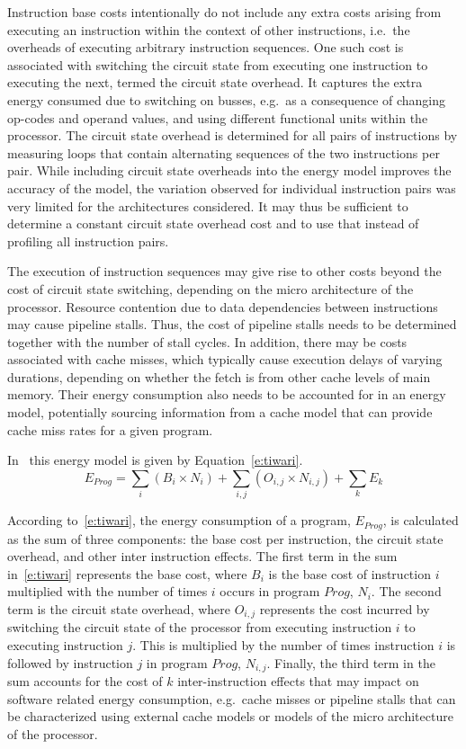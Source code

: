 Instruction base costs intentionally do not include any extra costs arising
from executing an instruction within the context of other instructions, i.e.\
the overheads of executing arbitrary instruction sequences.
%
One such cost is associated with switching the circuit state from executing one
instruction to executing the next, termed the circuit state overhead. It
captures the extra energy consumed due to switching on busses, e.g.\ as a
consequence of changing op-codes and operand values, and using different
functional units within the processor. The circuit state overhead is determined
for all pairs of instructions \todo{or pairs of types of instructions} by
measuring loops that contain alternating sequences of the two instructions per
pair.
%
While including circuit state overheads into the energy model improves the
accuracy of the model, the variation observed for individual instruction pairs
was very limited for the architectures considered. It may thus be sufficient to
determine a constant circuit state overhead cost and to use that instead of
profiling all instruction pairs.

The execution of instruction sequences may give rise to other costs beyond the
cost of circuit state switching, depending on the micro architecture of the
processor. Resource contention due to data dependencies between instructions
may cause pipeline stalls. Thus, the cost of pipeline stalls needs to be
determined together with the number of stall cycles.
%
In addition, there may be costs associated with cache misses, which typically
cause execution delays of varying durations, depending on whether the fetch is
from other cache levels of main memory. Their energy consumption also needs to
be accounted for in an energy model, potentially sourcing information from a
cache model that can provide cache miss rates for a given program.

In~\cite{TiwariWolfeInstructionLevelPowerAnalysi:1996} this energy model is
given by Equation~\ref{e:tiwari}.
%
\begin{equation}\label{e:tiwari}
E_{Prog} = \sum_i (B_i \times N_i) + \sum_{i,j} (O_{i,j} \times N_{i,j}) + \sum_k E_k
\end{equation}

According to~\ref{e:tiwari}, the energy consumption of a program, $E_{Prog}$, is
calculated as the sum of three components: the base cost per instruction, the
circuit state overhead, and other inter instruction effects.
%
The first term in the sum in~\ref{e:tiwari} represents the base cost, where $B_i$ is
the base cost of instruction $i$ multiplied with the number of times $i$ occurs
in program $\mathit{Prog}$, $N_i$.
%
The second term is the circuit state overhead, where $O_{i,j}$ represents the
cost incurred by switching the circuit state of the processor from executing
instruction $i$ to executing instruction $j$. This is multiplied by the number of
times instruction $i$ is followed by instruction $j$ in program $\mathit{Prog}$, $N_{i,j}$. 
%
Finally, the third term in the sum accounts for the cost of $k$ inter-instruction
effects that may impact on software related energy consumption, e.g.\ cache
misses or pipeline stalls that can be characterized using external cache models
or models of the micro architecture of the processor.

